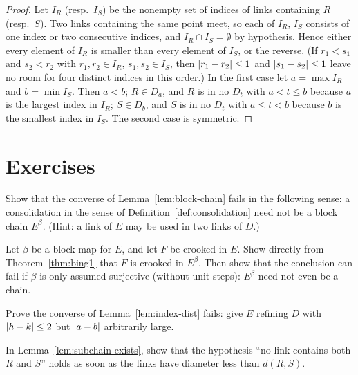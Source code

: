 \begin{proof}
Let $I_R$ (resp.\ $I_S$) be the nonempty set of indices of links containing $R$ (resp.\ $S$). Two links
containing the same point meet, so each of $I_R$, $I_S$ consists of one index or two consecutive indices,
and $I_R\cap I_S=\emptyset$ by hypothesis. Hence either every element of $I_R$ is smaller than every element
of $I_S$, or the reverse. (If $r_1<s_1$ and $s_2<r_2$ with $r_1,r_2\in I_R$, $s_1,s_2\in I_S$, then
$\left\lvert r_1-r_2\right\rvert\le1$ and $\left\lvert s_1-s_2\right\rvert\le1$ leave no room for four distinct indices in this order.) In the
first case let $a=\max I_R$ and $b=\min I_S$. Then $a<b$; $R\in D_a$, and $R$ is in no $D_t$ with $a<t\le b$
because $a$ is the largest index in $I_R$; $S\in D_b$, and $S$ is in no $D_t$ with $a\le t<b$ because $b$ is
the smallest index in $I_S$. The second case is symmetric.
\end{proof}


\section*{Exercises}

\begin{exercise}
Show that the converse of Lemma~\ref{lem:block-chain} fails in the following sense: a consolidation in
the sense of Definition~\ref{def:consolidation} need not be a block chain $E^\beta$. (Hint: a link of $E$
may be used in two links of $D$.)
\end{exercise}

\begin{exercise}
Let $\beta$ be a block map for $E$, and let $F$ be crooked in $E$. Show directly from
Theorem~\ref{thm:bing1} that $F$ is crooked in $E^\beta$. Then show that the conclusion can fail if $\beta$ is
only assumed surjective (without unit steps): $E^\beta$ need not even be a chain.
\end{exercise}

\begin{exercise}
Prove the converse of Lemma~\ref{lem:index-dist} fails: give $E$ refining $D$ with $\left\lvert h-k\right\rvert\le2$ but
$\left\lvert a-b\right\rvert$ arbitrarily large.
\end{exercise}

\begin{exercise}
In Lemma~\ref{lem:subchain-exists}, show that the hypothesis ``no link contains both $R$ and $S$'' holds as
soon as the links have diameter less than $d(R,S)$.
\end{exercise}
